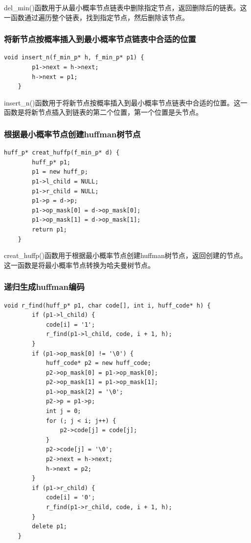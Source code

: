 \documentclass[UTF8,12pt]{article}
\begin{document}
del\_min()函数用于从最小概率节点链表中删除指定节点，返回删除后的链表。这一函数通过遍历整个链表，找到指定节点，然后删除该节点。

\subsubsection{将新节点按概率插入到最小概率节点链表中合适的位置}
\begin{lstlisting}[frame=shadowbox] 
    void insert_n(f_min_p* h, f_min_p* p1) {
        p1->next = h->next;
        h->next = p1;
    }
\end{lstlisting}

insert\_n()函数用于将新节点按概率插入到最小概率节点链表中合适的位置。这一函数是将新节点插入到链表的第二个位置，第一个位置是头节点。

\subsubsection{根据最小概率节点创建huffman树节点}
\begin{lstlisting}[frame=shadowbox] 
    huff_p* creat_huffp(f_min_p* d) {
        huff_p* p1;
        p1 = new huff_p;
        p1->l_child = NULL;
        p1->r_child = NULL;
        p1->p = d->p;
        p1->op_mask[0] = d->op_mask[0];
        p1->op_mask[1] = d->op_mask[1];
        return p1;
    }
\end{lstlisting}

creat\_huffp()函数用于根据最小概率节点创建huffman树节点，返回创建的节点。这一函数是将最小概率节点转换为哈夫曼树节点。

\subsubsection{递归生成huffman编码}
\begin{lstlisting}[frame=shadowbox] 
    void r_find(huff_p* p1, char code[], int i, huff_code* h) {
        if (p1->l_child) {
            code[i] = '1';
            r_find(p1->l_child, code, i + 1, h);
        }
        if (p1->op_mask[0] != '\0') {
            huff_code* p2 = new huff_code;
            p2->op_mask[0] = p1->op_mask[0];
            p2->op_mask[1] = p1->op_mask[1];
            p1->op_mask[2] = '\0';
            p2->p = p1->p;
            int j = 0;
            for (; j < i; j++) {
                p2->code[j] = code[j];
            }
            p2->code[j] = '\0';
            p2->next = h->next;
            h->next = p2;
        }
        if (p1->r_child) {
            code[i] = '0';
            r_find(p1->r_child, code, i + 1, h);
        }
        delete p1;
    }
\end{lstlisting}
\end{document}
